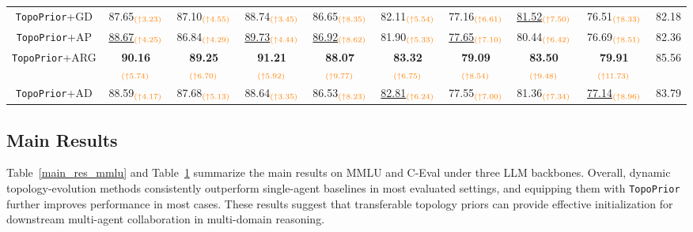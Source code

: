 \documentclass[lettersize,journal]{IEEEtran}
\theoremstyle{plain}
\begin{document}
\begin{table}[!t]
\begin{tabular}{cccccccccc}
\rowcolor{mylightgray} {\texttt{TopoPrior}+GD} & 87.65$_{\textcolor{orange}{(\uparrow 3.23)}}$ & 87.10$_{\textcolor{orange}{(\uparrow 4.55)}}$ & 88.74$_{\textcolor{orange}{(\uparrow 3.45)}}$ & 86.65$_{\textcolor{orange}{(\uparrow 8.35)}}$ & 82.11$_{\textcolor{orange}{(\uparrow 5.54)}}$ & 77.16$_{\textcolor{orange}{(\uparrow 6.61)}}$ & \underline{81.52}$_{\textcolor{orange}{(\uparrow 7.50)}}$ & 76.51$_{\textcolor{orange}{(\uparrow 8.33)}}$ & 82.18 \\
\rowcolor{mylightgray} {\texttt{TopoPrior}+AP} & \underline{88.67}$_{\textcolor{orange}{(\uparrow 4.25)}}$ & 86.84$_{\textcolor{orange}{(\uparrow 4.29)}}$ & \underline{89.73}$_{\textcolor{orange}{(\uparrow 4.44)}}$ & \underline{86.92}$_{\textcolor{orange}{(\uparrow 8.62)}}$ & 81.90$_{\textcolor{orange}{(\uparrow 5.33)}}$ & \underline{77.65}$_{\textcolor{orange}{(\uparrow 7.10)}}$ & 80.44$_{\textcolor{orange}{(\uparrow 6.42)}}$ & 76.69$_{\textcolor{orange}{(\uparrow 8.51)}}$ & 82.36 \\
\rowcolor{mylightgray} {\texttt{TopoPrior}+ARG} & \textbf{90.16}$_{\textcolor{orange}{(\uparrow 5.74)}}$ & \textbf{89.25}$_{\textcolor{orange}{(\uparrow 6.70)}}$ & \textbf{91.21}$_{\textcolor{orange}{(\uparrow 5.92)}}$ & \textbf{88.07}$_{\textcolor{orange}{(\uparrow 9.77)}}$ & \textbf{83.32}$_{\textcolor{orange}{(\uparrow 6.75)}}$ & \textbf{79.09}$_{\textcolor{orange}{(\uparrow 8.54)}}$ & \textbf{83.50}$_{\textcolor{orange}{(\uparrow 9.48)}}$ & \textbf{79.91}$_{\textcolor{orange}{(\uparrow 11.73)}}$ & 85.56 \\
\rowcolor{mylightgray} {\texttt{TopoPrior}+AD} & 88.59$_{\textcolor{orange}{(\uparrow 4.17)}}$ & 87.68$_{\textcolor{orange}{(\uparrow 5.13)}}$ & 88.64$_{\textcolor{orange}{(\uparrow 3.35)}}$ & 86.53$_{\textcolor{orange}{(\uparrow 8.23)}}$ & \underline{82.81}$_{\textcolor{orange}{(\uparrow 6.24)}}$ & 77.55$_{\textcolor{orange}{(\uparrow 7.00)}}$ & 81.36$_{\textcolor{orange}{(\uparrow 7.34)}}$ & \underline{77.14}$_{\textcolor{orange}{(\uparrow 8.96)}}$ & 83.79 \\
\bottomrule
\end{tabular}
\label{main_res_ceval}
\vspace{-.5em}
\end{table}

\subsection{Main Results}
Table~\ref{main_res_mmlu} and Table~\ref{main_res_ceval} summarize the main results on MMLU and C-Eval under three LLM backbones. Overall, dynamic topology-evolution methods consistently outperform single-agent baselines in most evaluated settings, and equipping them with \texttt{TopoPrior} further improves performance in most cases. These results suggest that transferable topology priors can provide effective initialization for downstream multi-agent collaboration in multi-domain reasoning.
\end{document}
